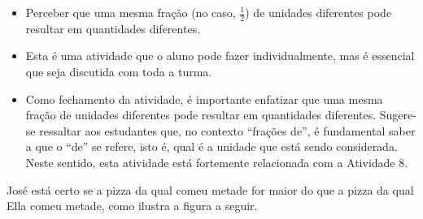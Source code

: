 \begin{atividade}\label{chap2-ativ14}
\objetivos
  \begin{itemize} %
    \item       Perceber que uma mesma fração (no caso, $\frac{1}{2}$) de unidades diferentes pode resultar em quantidades diferentes.
\end{itemize} %

\discussoes
  \begin{itemize} %
    \item       Esta é uma atividade que o aluno pode fazer individualmente, mas é essencial que seja discutida com toda a turma.
    \item       Como fechamento da atividade, é importante enfatizar que  uma mesma fração de unidades diferentes pode resultar em quantidades diferentes. Sugere-se ressaltar aos estudantes que, no contexto ``frações de'', é fundamental saber a que o ``de'' se refere, isto é, qual é a unidade que está sendo considerada. Neste sentido, esta atividade está fortemente relacionada com a Atividade 8.
\end{itemize} %

\solucao
  José está certo se a pizza da qual comeu metade for maior do que a pizza da qual Ella comeu metade, como ilustra a figura a seguir.
  \begin{center}

  \end{center}
\end{atividade}

\clearpage

